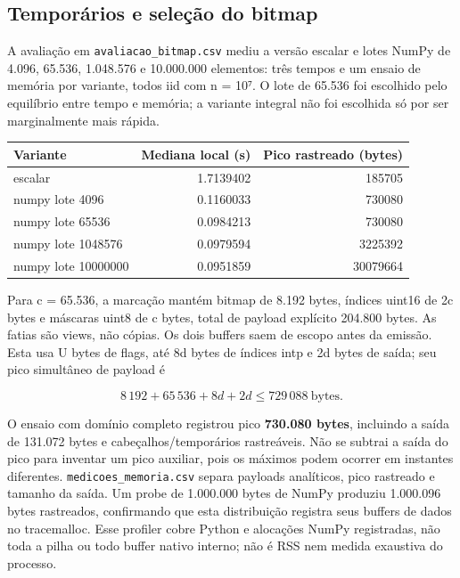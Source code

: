\documentclass[
  brazilian,
  11pt,
  a4paper,
]{article}
\newcounter{none} %
\begin{document}
\subsection{Temporários e seleção do
bitmap}\label{temporuxe1rios-e-seleuxe7uxe3o-do-bitmap}

A avaliação em \texttt{avaliacao\_\allowbreak{}bitmap.\allowbreak{}csv}
mediu a versão escalar e lotes NumPy de 4.096, 65.536, 1.048.576 e
10.000.000 elementos: três tempos e um ensaio de memória por variante,
todos iid com n = 10⁷. O lote de 65.536 foi escolhido pelo equilíbrio
entre tempo e memória; a variante integral não foi escolhida só por ser
marginalmente mais rápida.

{\def\LTcaptype{none} %
\begin{longtable}[]{@{}lrr@{}}
\toprule\noalign{}
Variante & Mediana local (s) & Pico rastreado (bytes) \\
\midrule\noalign{}
\endhead
\bottomrule\noalign{}
\endlastfoot
escalar & 1.7139402 & 185705 \\
numpy lote 4096 & 0.1160033 & 730080 \\
numpy lote 65536 & 0.0984213 & 730080 \\
numpy lote 1048576 & 0.0979594 & 3225392 \\
numpy lote 10000000 & 0.0951859 & 30079664 \\
\end{longtable}
}

Para c = 65.536, a marcação mantém bitmap de 8.192 bytes, índices uint16
de 2c bytes e máscaras uint8 de c bytes, total de payload explícito
204.800 bytes. As fatias são views, não cópias. Os dois buffers saem de
escopo antes da emissão. Esta usa U bytes de flags, até 8d bytes de
índices intp e 2d bytes de saída; seu pico simultâneo de payload é

\[8\,192+65\,536+8d+2d\le729\,088\ \text{bytes}.\]

O ensaio com domínio completo registrou pico \textbf{730.080 bytes},
incluindo a saída de 131.072 bytes e cabeçalhos/temporários rastreáveis.
Não se subtrai a saída do pico para inventar um pico auxiliar, pois os
máximos podem ocorrer em instantes diferentes.
\texttt{medicoes\_\allowbreak{}memoria.\allowbreak{}csv} separa payloads
analíticos, pico rastreado e tamanho da saída. Um probe de 1.000.000
bytes de NumPy produziu 1.000.096 bytes rastreados, confirmando que esta
distribuição registra seus buffers de dados no tracemalloc. Esse
profiler cobre Python e alocações NumPy registradas, não toda a pilha ou
todo buffer nativo interno; não é RSS nem medida exaustiva do processo.
\end{document}
